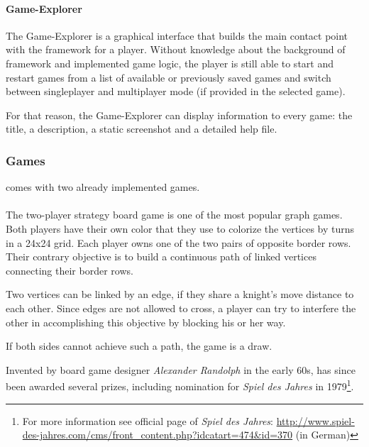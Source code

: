 \paragraph*{Game-Explorer}
The Game-Explorer is a graphical interface that builds the main contact point with the framework for a \gls{player}. Without knowledge about the background of framework and implemented \gls{game} logic, the player is still able to start and restart games from a list of available or previously saved games and switch between singleplayer and multiplayer mode (if provided in the selected game).\par
For that reason, the Game-Explorer can display information to every game: the title, a description, a static screenshot and a detailed help file.\par

\subsubsection{Games}
{\graphioli} comes with two already implemented games.\par
\paragraph*{\twixt}
The two-player strategy board game {\twixt} is one of the most popular graph games. Both players have their own color that they use to colorize the vertices by turns in a 24x24 grid. Each player owns one of the two pairs of opposite border rows. Their contrary objective is to build a continuous \gls{path} of linked vertices connecting their border rows.\par
Two vertices can be linked by an edge, if they share a knight's move distance to each other. Since edges are not allowed to cross, a player can try to interfere the other in accomplishing this objective by blocking his or her way.\par
If both sides cannot achieve such a path, the game is a draw.\par
Invented by board game designer \emph{Alexander Randolph} in the early 60s, {\twixt} has since been awarded several prizes, including nomination for \emph{Spiel des Jahres} in 1979\footnote{For more information see official page of \emph{Spiel des Jahres}: \url{http://www.spiel-des-jahres.com/cms/front_content.php?idcatart=474&id=370} (in German)}.\par
